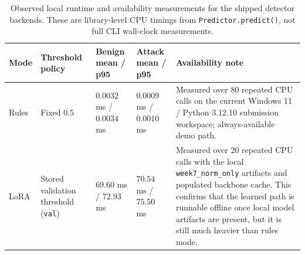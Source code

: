 ﻿\begin{table}[t]
\centering
\caption{Observed local runtime and availability measurements for the shipped detector backends. These are library-level CPU timings from \texttt{Predictor.predict()}, not full CLI wall-clock measurements.}
\label{tab:runtime_benchmark}
\scriptsize
\begin{tabularx}{\textwidth}{p{}p{}p{}p{}X}
\toprule
Mode & Threshold policy & Benign mean / p95 & Attack mean / p95 & Availability note \\
\midrule
Rules & Fixed $0.5$ & $0.0032$ ms / $0.0034$ ms & $0.0009$ ms / $0.0010$ ms & Measured over 80 repeated CPU calls on the current Windows 11 / Python 3.12.10 submission workspace; always-available demo path. \\
LoRA & Stored validation threshold (\texttt{val}) & $69.60$ ms / $72.93$ ms & $70.54$ ms / $75.50$ ms & Measured over 20 repeated CPU calls with the local \texttt{week7\_norm\_only} artifacts and populated backbone cache. This confirms that the learned path is runnable offline once local model artifacts are present, but it is still much heavier than rules mode. \\
\bottomrule
\end{tabularx}
\normalsize
\end{table}
